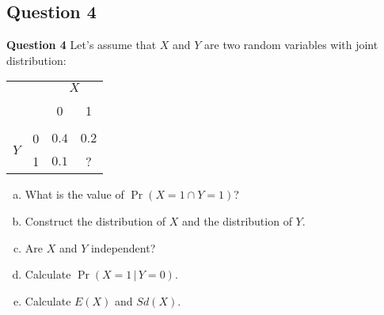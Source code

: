 \documentclass[compress]{beamer}        %
\makeatletter
\newcommand{\tcb}{\textcolor{beamer@blendedblue}}
\makeatother
\begin{document}
\subsection{Question 4}
\begin{frame}{\bf \tcb{Question 4}}
Let's assume that $X$ and $Y$ are two random variables with joint distribution:\vspace{-0.5cm}
\begin{center}
\begin{tabular}{c|c|cc|}
\multicolumn{2}{c}{} & \multicolumn{2}{c}{$X$} \\
\cline{2-4}
&&&\\[-0.4cm]
&&                          0 & 1 \\
\cline{2-4}
&&&\\[-0.3cm]
\multirow{2}{*}{$Y$} & 0 & $0.4$ &  $0.2$ \\[0.1cm]
                     & 1 & $0.1$ &  ? \\[0.1cm]
\cline{2-4}
\end{tabular}
\end{center}

\begin{enumerate}[a)]\itemsep0.2cm
\item What is the value of $\Pr(X=1\cap Y=1)$?
\item Construct the distribution of $X$ and the distribution of $Y$.
\item Are $X$ and $Y$ independent?
\item Calculate $\Pr(X=1\,|\,Y=0)$.
\item Calculate $E(X)$ and $Sd(X)$.
\end{enumerate}

\end{frame}
\end{document}
